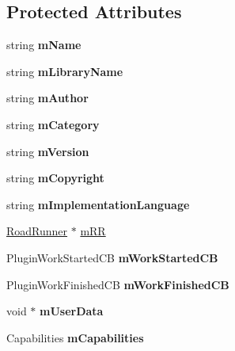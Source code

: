 \subsection*{Protected Attributes}
\begin{DoxyCompactItemize}
\item 
\hypertarget{classrr_1_1_plugin_a6059c1e3d11b7809ee8827be259366c6}{string {\bfseries m\-Name}}\label{classrr_1_1_plugin_a6059c1e3d11b7809ee8827be259366c6}

\item 
\hypertarget{classrr_1_1_plugin_af3184668df25348c832c011d1174232b}{string {\bfseries m\-Library\-Name}}\label{classrr_1_1_plugin_af3184668df25348c832c011d1174232b}

\item 
\hypertarget{classrr_1_1_plugin_a2725a28084d65929d0dcb5b764523f50}{string {\bfseries m\-Author}}\label{classrr_1_1_plugin_a2725a28084d65929d0dcb5b764523f50}

\item 
\hypertarget{classrr_1_1_plugin_ac2b519b639847ffc44565b84e42ba305}{string {\bfseries m\-Category}}\label{classrr_1_1_plugin_ac2b519b639847ffc44565b84e42ba305}

\item 
\hypertarget{classrr_1_1_plugin_a9dd94fa3a64d8b71567c1e2cdbc9e341}{string {\bfseries m\-Version}}\label{classrr_1_1_plugin_a9dd94fa3a64d8b71567c1e2cdbc9e341}

\item 
\hypertarget{classrr_1_1_plugin_a4e583b70a504fa3285cd4ec9a6bf78a6}{string {\bfseries m\-Copyright}}\label{classrr_1_1_plugin_a4e583b70a504fa3285cd4ec9a6bf78a6}

\item 
\hypertarget{classrr_1_1_plugin_a4e0973e2f09ecd7be62f2edea0a1523b}{string {\bfseries m\-Implementation\-Language}}\label{classrr_1_1_plugin_a4e0973e2f09ecd7be62f2edea0a1523b}

\item 
\hyperlink{classrr_1_1_road_runner}{Road\-Runner} $\ast$ \hyperlink{classrr_1_1_plugin_a285d886ef2d34534d290543db80b0f09}{m\-R\-R}
\item 
\hypertarget{classrr_1_1_plugin_ab6a9de17d75e4225a643113700afac1d}{Plugin\-Work\-Started\-C\-B {\bfseries m\-Work\-Started\-C\-B}}\label{classrr_1_1_plugin_ab6a9de17d75e4225a643113700afac1d}

\item 
\hypertarget{classrr_1_1_plugin_a78927752af07f5a6371593938e9ebc7f}{Plugin\-Work\-Finished\-C\-B {\bfseries m\-Work\-Finished\-C\-B}}\label{classrr_1_1_plugin_a78927752af07f5a6371593938e9ebc7f}

\item 
\hypertarget{classrr_1_1_plugin_a540affc42253156fa4c1730e314f68ce}{void $\ast$ {\bfseries m\-User\-Data}}\label{classrr_1_1_plugin_a540affc42253156fa4c1730e314f68ce}

\item 
\hypertarget{classrr_1_1_plugin_a58ee7f1a0b7c18b168dbdf0e5c2a298d}{Capabilities {\bfseries m\-Capabilities}}\label{classrr_1_1_plugin_a58ee7f1a0b7c18b168dbdf0e5c2a298d}

\end{DoxyCompactItemize}
